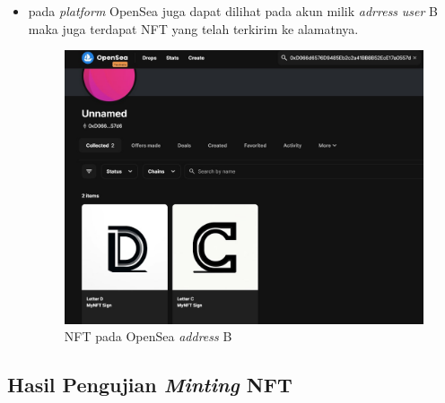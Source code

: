 \begin{itemize}
    \item pada \emph{platform} OpenSea juga dapat dilihat pada akun milik \emph{adrress} \emph{user} B maka juga terdapat NFT yang telah terkirim ke alamatnya.

    \begin{figure} [H] \centering
    \includegraphics[scale=0.35]{gambar/nft_pada_opensea_2.jpeg}
    \caption{NFT pada OpenSea \emph{address} B}
    \label{fig:opensea2}
    \end{figure}
    
\end{itemize}

\subsection{Hasil Pengujian \emph{Minting} NFT}
\label{sec:pengujian_kedua}


